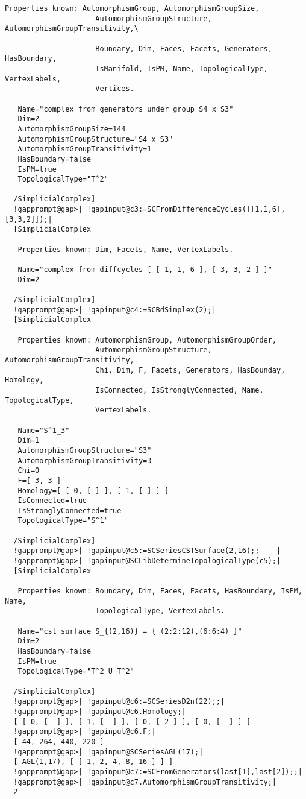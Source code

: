 \documentclass[a4paper,11pt]{report}
\begin{document}
{{\begin{Verbatim}[commandchars=!@|,fontsize=\small,frame=single,label=Example]
   Properties known: AutomorphismGroup, AutomorphismGroupSize, 
                     AutomorphismGroupStructure, AutomorphismGroupTransitivity,\
   
                     Boundary, Dim, Faces, Facets, Generators, HasBoundary, 
                     IsManifold, IsPM, Name, TopologicalType, VertexLabels, 
                     Vertices.
  
   Name="complex from generators under group S4 x S3"
   Dim=2
   AutomorphismGroupSize=144
   AutomorphismGroupStructure="S4 x S3"
   AutomorphismGroupTransitivity=1
   HasBoundary=false
   IsPM=true
   TopologicalType="T^2"
  
  /SimplicialComplex]
  !gapprompt@gap>| !gapinput@c3:=SCFromDifferenceCycles([[1,1,6],[3,3,2]]);|
  [SimplicialComplex
  
   Properties known: Dim, Facets, Name, VertexLabels.
  
   Name="complex from diffcycles [ [ 1, 1, 6 ], [ 3, 3, 2 ] ]"
   Dim=2
  
  /SimplicialComplex]
  !gapprompt@gap>| !gapinput@c4:=SCBdSimplex(2);|
  [SimplicialComplex
  
   Properties known: AutomorphismGroup, AutomorphismGroupOrder, 
                     AutomorphismGroupStructure, AutomorphismGroupTransitivity, 
                     Chi, Dim, F, Facets, Generators, HasBounday, Homology, 
                     IsConnected, IsStronglyConnected, Name, TopologicalType, 
                     VertexLabels.
  
   Name="S^1_3"
   Dim=1
   AutomorphismGroupStructure="S3"
   AutomorphismGroupTransitivity=3
   Chi=0
   F=[ 3, 3 ]
   Homology=[ [ 0, [ ] ], [ 1, [ ] ] ]
   IsConnected=true
   IsStronglyConnected=true
   TopologicalType="S^1"
  
  /SimplicialComplex]
  !gapprompt@gap>| !gapinput@c5:=SCSeriesCSTSurface(2,16);;    |
  !gapprompt@gap>| !gapinput@SCLibDetermineTopologicalType(c5);|
  [SimplicialComplex
  
   Properties known: Boundary, Dim, Faces, Facets, HasBoundary, IsPM, Name, 
                     TopologicalType, VertexLabels.
  
   Name="cst surface S_{(2,16)} = { (2:2:12),(6:6:4) }"
   Dim=2
   HasBoundary=false
   IsPM=true
   TopologicalType="T^2 U T^2"
  
  /SimplicialComplex]
  !gapprompt@gap>| !gapinput@c6:=SCSeriesD2n(22);;|
  !gapprompt@gap>| !gapinput@c6.Homology;|
  [ [ 0, [  ] ], [ 1, [  ] ], [ 0, [ 2 ] ], [ 0, [  ] ] ]
  !gapprompt@gap>| !gapinput@c6.F;|
  [ 44, 264, 440, 220 ]
  !gapprompt@gap>| !gapinput@SCSeriesAGL(17);|
  [ AGL(1,17), [ [ 1, 2, 4, 8, 16 ] ] ]
  !gapprompt@gap>| !gapinput@c7:=SCFromGenerators(last[1],last[2]);;|
  !gapprompt@gap>| !gapinput@c7.AutomorphismGroupTransitivity;|
  2
\end{Verbatim}
 }

}
\end{document}
